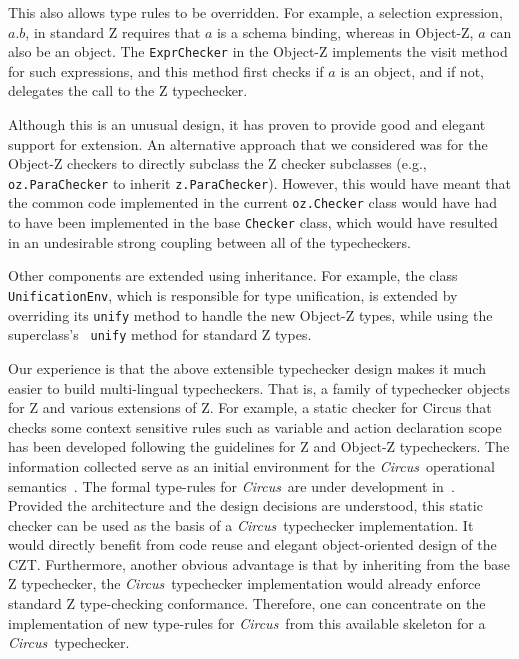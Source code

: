 \documentclass{llncs}
\newcommand{\Circus}{{\sf\slshape Circus}}
\begin{document}
This also allows type rules to be overridden. For example, a
selection expression, $a.b$, in standard Z requires that $a$ is a
schema binding, whereas in Object-Z, $a$ can also be an object. The
{\tt ExprChecker} in the Object-Z implements the visit method for such
expressions, and this method first checks if $a$ is an object, and if
not, delegates the call to the Z typechecker.


Although this is an unusual design, it has proven to provide good
and elegant support for extension.  An alternative approach that we
considered was for the Object-Z checkers to directly subclass the Z
checker subclasses (e.g., \texttt{oz.ParaChecker} to inherit
\texttt{z.ParaChecker}).  However, this would have meant that the
common code implemented in the current
\texttt{oz.Checker} class would have had to have been
implemented in the base {\tt Checker} class, which would have resulted
in an undesirable strong coupling between all of the typecheckers.

Other components are extended using inheritance.  For example, the
class \texttt{UnificationEnv}, which is responsible for type
unification, is extended by overriding its {\tt unify} method to
handle the new Object-Z types, while using the superclass's {\tt
unify} method for standard Z types.

Our experience is that the above extensible typechecker design makes
it much easier to build multi-lingual typecheckers.  That is, a family
of typechecker objects for Z and various extensions of Z.
%
For example, a static checker for Circus that checks some context sensitive
rules such as variable and action declaration scope has been developed
following the guidelines for Z and Object-Z typecheckers. The information collected
serve as an initial environment for the \Circus\ operational semantics~\cite{circus.mc:opsem}.
The formal type-rules for \Circus\ are under development in~\cite{circus.other:typechecker}.
Provided the architecture and the design decisions are understood, this static checker can
be used as the basis of a \Circus\ typechecker implementation. It would directly benefit from
code reuse and elegant object-oriented design of the CZT. Furthermore,
another obvious advantage is that by inheriting from the base Z typechecker,
the \Circus\ typechecker implementation would already enforce standard Z type-checking conformance.
Therefore, one can concentrate on the implementation of new type-rules for \Circus\
from this available skeleton for a \Circus\ typechecker.
\end{document}
